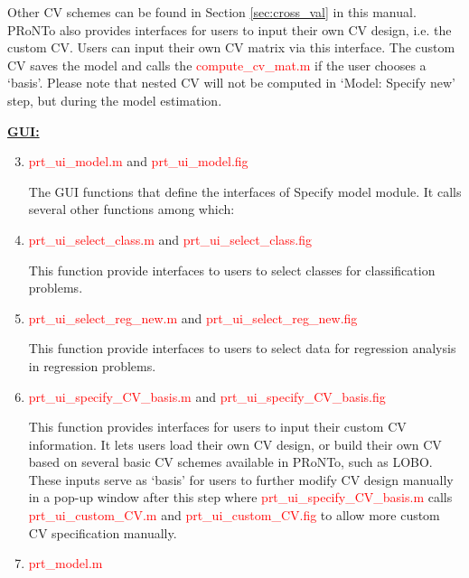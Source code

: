 \begin{enumerate}
Other CV schemes can be found in Section \ref{sec:cross_val} in this manual. PRoNTo also provides interfaces for users to input their own CV design, i.e. the custom CV. Users can input their own CV matrix via this interface. The custom CV saves the model and calls the \textcolor{red}{compute\_cv\_mat.m} if the user chooses a `basis'. Please note that nested CV will not be computed in `Model: Specify new' step, but during the model estimation.
 
\end{enumerate}


\noindent \textbf{\underline{GUI:}}

\begin{enumerate}
\setcounter{enumi}{2}

\item \textcolor{red}{prt\_ui\_model.m}  and \textcolor{red}{prt\_ui\_model.fig}

The GUI functions that define the interfaces of Specify model module. It calls several other functions among which:


\item \textcolor{red}{prt\_ui\_select\_class.m} and \textcolor{red}{prt\_ui\_select\_class.fig}

This function provide interfaces to users to select classes for classification problems.


\item \textcolor{red}{prt\_ui\_select\_reg\_new.m} and \textcolor{red}{prt\_ui\_select\_reg\_new.fig}

This function provide interfaces to users to select data for regression analysis in regression problems.

\item \textcolor{red}{prt\_ui\_specify\_CV\_basis.m} and \textcolor{red}{prt\_ui\_specify\_CV\_basis.fig}

This function provides interfaces for users to input their custom CV information. It lets users load their own CV design, or build their own CV based on several basic CV schemes available in PRoNTo, such as LOBO. These inputs serve as   `basis' for users to further modify CV design manually in a pop-up window after this step where \textcolor{red}{prt\_ui\_specify\_CV\_basis.m} calls \textcolor{red}{prt\_ui\_custom\_CV.m} and \textcolor{red}{prt\_ui\_custom\_CV.fig} to allow more custom CV specification manually.

\item \textcolor{red}{prt\_model.m}


\end{enumerate}
